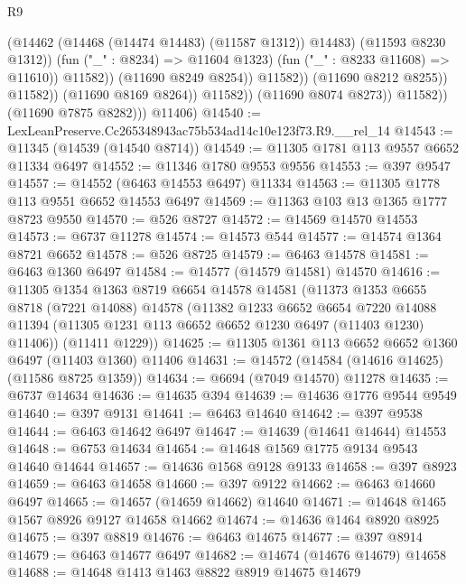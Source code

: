 \begin{lexlean}{R9}
\begin{coremodule}
                                          (@14462 (@14468 (@14474 @14483) (@11587 @1312)) @14483)
                                          (@11593 @8230 @1312))
                                        (fun ("_" : @8234) => @11604 @1323)
                                        (fun ("_" : @8233 @11608) => @11610))
                                      @11582))
                                  (@11690 @8249 @8254))
                                @11582))
                            (@11690 @8212 @8255))
                          @11582))
                      (@11690 @8169 @8264))
                    @11582))
                (@11690 @8074 @8273))
              @11582))
          (@11690 @7875 @8282)))
      @11406)
@14540 := LexLeanPreserve.Cc265348943ac75b534ad14c10e123f73.R9.__rel_14
@14543 := @11345 (@14539 (@14540 @8714))
@14549 := @11305 @1781 @113 @9557 @6652 @11334 @6497
@14552 := @11346 @1780 @9553 @9556
@14553 := @397 @9547
@14557 := @14552 (@6463 @14553 @6497) @11334
@14563 := @11305 @1778 @113 @9551 @6652 @14553 @6497
@14569 := @11363 @103 @13 @1365 @1777 @8723 @9550
@14570 := @526 @8727
@14572 := @14569 @14570 @14553
@14573 := @6737 @11278
@14574 := @14573 @544
@14577 := @14574 @1364 @8721 @6652
@14578 := @526 @8725
@14579 := @6463 @14578
@14581 := @6463 @1360 @6497
@14584 := @14577 (@14579 @14581) @14570
@14616 := @11305
    @1354
    @1363
    @8719
    @6654
    @14578
    @14581
    (@11373
      @1353
      @6655
      @8718
      (@7221 @14088)
      @14578
      (@11382
        @1233
        @6652
        @6654
        @7220
        @14088
        @11394
        (@11305 @1231 @113 @6652 @6652 @1230 @6497 (@11403 @1230) @11406))
      (@11411 @1229))
@14625 := @11305 @1361 @113 @6652 @6652 @1360 @6497 (@11403 @1360) @11406
@14631 := @14572 (@14584 (@14616 @14625) (@11586 @8725 @1359))
@14634 := @6694 (@7049 @14570) @11278
@14635 := @6737 @14634
@14636 := @14635 @394
@14639 := @14636 @1776 @9544 @9549
@14640 := @397 @9131
@14641 := @6463 @14640
@14642 := @397 @9538
@14644 := @6463 @14642 @6497
@14647 := @14639 (@14641 @14644) @14553
@14648 := @6753 @14634
@14654 := @14648 @1569 @1775 @9134 @9543 @14640 @14644
@14657 := @14636 @1568 @9128 @9133
@14658 := @397 @8923
@14659 := @6463 @14658
@14660 := @397 @9122
@14662 := @6463 @14660 @6497
@14665 := @14657 (@14659 @14662) @14640
@14671 := @14648 @1465 @1567 @8926 @9127 @14658 @14662
@14674 := @14636 @1464 @8920 @8925
@14675 := @397 @8819
@14676 := @6463 @14675
@14677 := @397 @8914
@14679 := @6463 @14677 @6497
@14682 := @14674 (@14676 @14679) @14658
@14688 := @14648 @1413 @1463 @8822 @8919 @14675 @14679

\end{coremodule}
\end{lexlean}
